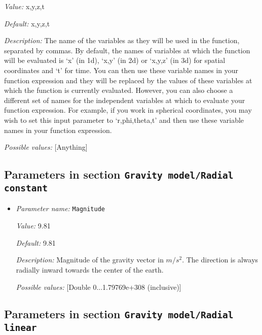 \begin{itemize}
{\it Value:} x,y,z,t


{\it Default:} x,y,z,t


{\it Description:} The name of the variables as they will be used in the function, separated by commas. By default, the names of variables at which the function will be evaluated is `x' (in 1d), `x,y' (in 2d) or `x,y,z' (in 3d) for spatial coordinates and `t' for time. You can then use these variable names in your function expression and they will be replaced by the values of these variables at which the function is currently evaluated. However, you can also choose a different set of names for the independent variables at which to evaluate your function expression. For example, if you work in spherical coordinates, you may wish to set this input parameter to `r,phi,theta,t' and then use these variable names in your function expression.


{\it Possible values:} [Anything]
\end{itemize}

\subsection{Parameters in section \tt Gravity model/Radial constant}
\label{parameters:Gravity_20model/Radial_20constant}

\begin{itemize}
\item {\it Parameter name:} {\tt Magnitude}
\label{parameters:Gravity model/Radial constant/Magnitude}


{\it Value:} 9.81


{\it Default:} 9.81


{\it Description:} Magnitude of the gravity vector in $m/s^2$. The direction is always radially inward towards the center of the earth.


{\it Possible values:} [Double 0...1.79769e+308 (inclusive)]
\end{itemize}

\subsection{Parameters in section \tt Gravity model/Radial linear}
\label{parameters:Gravity_20model/Radial_20linear}

